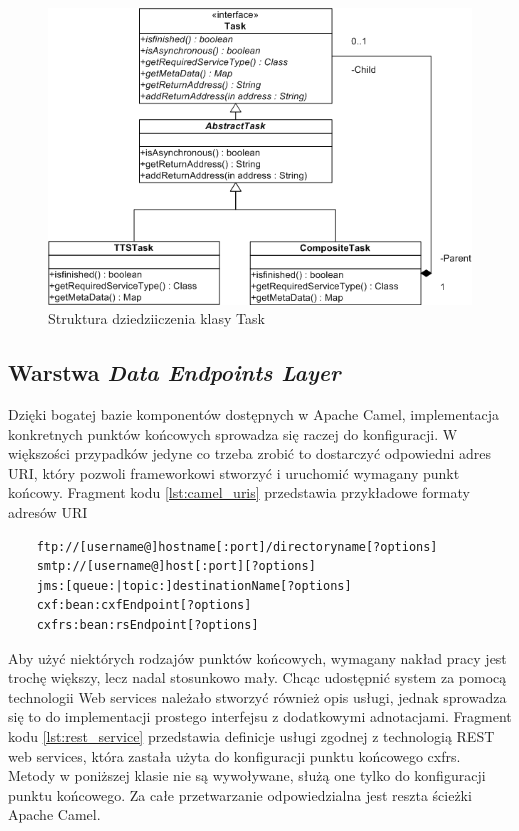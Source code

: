 \begin{figure}[!h]
	\centering
	\includegraphics[scale=0.7]{tasks_hierarhy.png}
	\caption{Struktura dziedziiczenia klasy Task}\label{fig:task_class_hierarchy}
\end{figure}


\subsection{Warstwa \textit{Data Endpoints Layer}}

Dzięki bogatej bazie komponentów dostępnych w Apache Camel, implementacja konkretnych punktów końcowych sprowadza się raczej do konfiguracji. W większości przypadków jedyne co trzeba zrobić to dostarczyć odpowiedni adres URI, który pozwoli frameworkowi stworzyć i uruchomić wymagany punkt końcowy. Fragment kodu \ref{lst:camel_uris} przedstawia przykładowe formaty adresów URI

\lstset{language=Java, tabsize=4, caption=Przykładowe formaty adresów URI dla punktów końcowych Apache Camel.,label=lst:camel_uris}

\begin{center}
\begin{lstlisting}
	ftp://[username@]hostname[:port]/directoryname[?options]
	smtp://[username@]host[:port][?options]
	jms:[queue:|topic:]destinationName[?options]
	cxf:bean:cxfEndpoint[?options]
	cxfrs:bean:rsEndpoint[?options]
\end{lstlisting}
\end{center}

Aby użyć niektórych rodzajów punktów końcowych, wymagany nakład pracy jest trochę większy, lecz nadal stosunkowo mały. Chcąc udostępnić system za pomocą technologii Web services należało stworzyć również opis usługi, jednak sprowadza się to do implementacji prostego interfejsu z dodatkowymi adnotacjami.  Fragment kodu \ref{lst:rest_service} przedstawia definicje usługi zgodnej z technologią REST web services, która zastała użyta do konfiguracji punktu końcowego cxfrs. Metody w poniższej klasie nie są wywoływane, służą one tylko do konfiguracji punktu końcowego. Za całe przetwarzanie odpowiedzialna jest reszta ścieżki Apache Camel.



